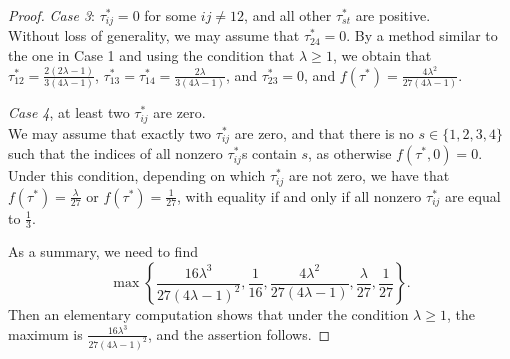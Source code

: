 \documentclass[10pt,a4paper]{amsart}
\begin{document}
\begin{proof}
\emph{Case 3}: $\tau_{ij}^* = 0$ for some $ij \neq 12$, and all other $\tau_{st}^*$ are positive.\\
Without loss of generality, we may assume that $\tau_{24}^* = 0$. By a method similar to the one in Case 1 and using the condition that $\lambda \geq 1$, we obtain that $\tau_{12}^* = \frac{2(2\lambda-1)}{3(4\lambda-1)}$, $\tau_{13}^* = \tau_{14}^* = \frac{2\lambda}{3(4\lambda-1)}$, and $\tau_{23}^* = 0$, and $f(\tau^*)=\frac{4\lambda^2}{27(4\lambda-1)}$.

\emph{Case 4}, at least two $\tau_{ij}^*$ are zero.\\
We may assume that exactly two $\tau_{ij}^*$ are zero, and that there is no $s \in \{1,2,3,4\}$ such that the indices of all nonzero $\tau_{ij}^*$s contain $s$, as otherwise $f(\tau^*,0)=0$. Under this condition, depending on which $\tau_{ij}^*$ are not zero, we have that $f(\tau^*)=\frac{\lambda}{27}$ or $f(\tau^*)=\frac{1}{27}$, with equality if and only if all nonzero $\tau_{ij}^*$ are equal to $\frac{1}{3}$.

As a summary, we need to find
\[
\max \left \{ \frac{16 \lambda^3}{27(4\lambda - 1)^2}, \frac{1}{16}, \frac{4\lambda^2}{27(4\lambda-1)}, \frac{\lambda}{27}, \frac{1}{27} \right\}.
\]
Then an elementary computation shows that under the condition $\lambda \geq 1$, the maximum is $\frac{16 \lambda^3}{27(4\lambda - 1)^2}$, and the assertion follows.
\end{proof}
\end{document}
